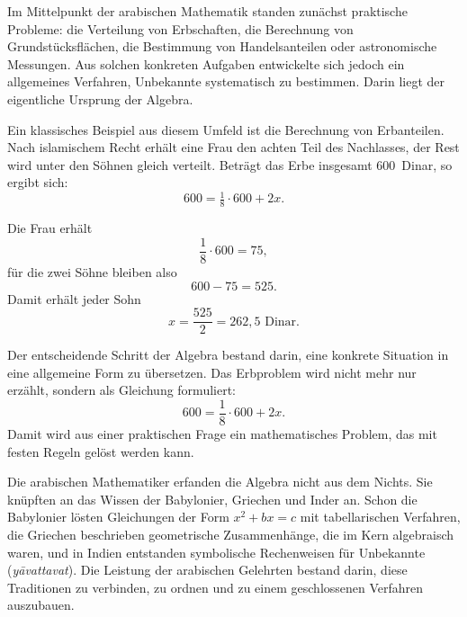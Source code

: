 \begin{HistoryBox}
		\label{box:praxis}
	Im Mittelpunkt der arabischen Mathematik standen zunächst praktische Probleme:
	die Verteilung von Erbschaften, die Berechnung von Grundstücksflächen,
	die Bestimmung von Handelsanteilen oder astronomische Messungen.
	Aus solchen konkreten Aufgaben entwickelte sich jedoch ein allgemeines Verfahren,
	Unbekannte systematisch zu bestimmen.
	Darin liegt der eigentliche Ursprung der Algebra.

\end{HistoryBox}

Ein klassisches Beispiel aus diesem Umfeld ist die Berechnung von Erbanteilen.
Nach islamischem Recht erhält eine Frau den achten Teil des Nachlasses,
der Rest wird unter den Söhnen gleich verteilt.
Beträgt das Erbe insgesamt 600~Dinar, so ergibt sich:
\[
600 = \tfrac{1}{8}\cdot 600 + 2x.
\]

Die Frau erhält
\[
\frac{1}{8}\cdot 600 = 75,
\]
für die zwei Söhne bleiben also
\[
600 - 75 = 525.
\]
Damit erhält jeder Sohn
\[
x = \frac{525}{2} = 262{,}5 \text{ Dinar}.
\]

\begin{HistoryBox}
	\label{box:abstraktegleichung}
	Der entscheidende Schritt der Algebra bestand darin,
	eine konkrete Situation in eine allgemeine Form zu übersetzen.
	Das Erbproblem wird nicht mehr nur erzählt, sondern als Gleichung formuliert:
	\[
	600 = \frac{1}{8}\cdot 600 + 2x.
	\]
	Damit wird aus einer praktischen Frage ein mathematisches Problem,
	das mit festen Regeln gelöst werden kann.
\end{HistoryBox}

\begin{NoteBox}
	\label{box:erben}
	Die arabischen Mathematiker erfanden die Algebra nicht aus dem Nichts.
	Sie knüpften an das Wissen der Babylonier, Griechen und Inder an.
	Schon die Babylonier lösten Gleichungen der Form \(x^2 + bx = c\)
	mit tabellarischen Verfahren, die Griechen beschrieben geometrische Zusammenhänge,
	die im Kern algebraisch waren,
	und in Indien entstanden symbolische Rechenweisen für Unbekannte
	(\emph{yāvattavat}).
	Die Leistung der arabischen Gelehrten bestand darin,
	diese Traditionen zu verbinden, zu ordnen und zu einem geschlossenen Verfahren auszubauen.
\end{NoteBox}

